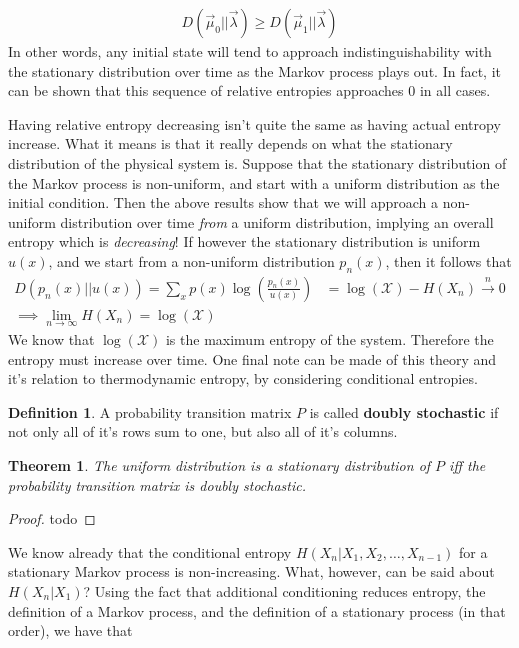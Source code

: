 \documentclass{article}
\theoremstyle{definition}
\newtheorem{definition}{Definition}[section]
\theoremstyle{plain}
\newtheorem{theorem}{Theorem}[section]
\begin{document}
\begin{align}
	D(\vec{\mu}_0||\vec{\lambda}) \geq D(\vec{\mu}_1||\vec{\lambda})
\end{align}
In other words, any initial state will tend to approach indistinguishability with the stationary distribution over time as the Markov process plays out. In fact, it can be shown that this sequence of relative entropies approaches $0$ in all cases. \par 
Having relative entropy decreasing isn't quite the same as having actual entropy increase. What it means is that it really depends on what the stationary distribution of the physical system is. Suppose that the stationary distribution of the Markov process is non-uniform, and start with a uniform distribution as the initial condition. Then the above results show that we will approach a non-uniform distribution over time \emph{from} a uniform distribution, implying an overall entropy which is \emph{decreasing}! If however the stationary distribution is uniform $u(x)$, and we start from a non-uniform distribution $p_n(x)$, then it follows that
\begin{align}
	D(p_n(x)||u(x)) = \sum_x p(x)\log\left( \frac{p_n(x)}{u(x)} \right) &= \log(\mathcal{X}) - H(X_n) \overset{n}{\to} 0 \\ \implies \lim_{n \to \infty} H(X_n) = \log(\mathcal{X})
\end{align}
We know that $\log(\mathcal{X})$ is the maximum entropy of the system. Therefore the entropy must increase over time. One final note can be made of this theory and it's relation to thermodynamic entropy, by considering conditional entropies.  
\begin{definition}
	A probability transition matrix $P$ is called \textbf{doubly stochastic} if not only all of it's rows sum to one, but also all of it's columns. 
\end{definition}
\begin{theorem}
	The uniform distribution is a stationary distribution of $P$ iff the probability transition matrix is doubly stochastic. 
\end{theorem}
\begin{proof}
	todo
\end{proof}
We know already that the conditional entropy $H(X_n|X_1,X_2,\ldots,X_{n-1})$ for a stationary Markov process is non-increasing. What, however, can be said about $H(X_n|X_1)$? Using the fact that additional conditioning reduces entropy, the definition of a Markov process, and the definition of a stationary process (in that order), we have that
\end{document}
